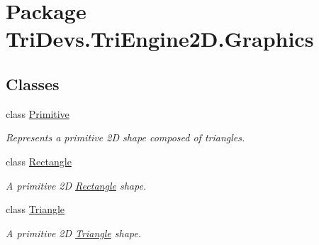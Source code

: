 \hypertarget{namespace_tri_devs_1_1_tri_engine2_d_1_1_graphics}{\section{Package Tri\-Devs.\-Tri\-Engine2\-D.\-Graphics}
\label{namespace_tri_devs_1_1_tri_engine2_d_1_1_graphics}
}
\subsection*{Classes}
\begin{DoxyCompactItemize}
\item 
class \hyperlink{class_tri_devs_1_1_tri_engine2_d_1_1_graphics_1_1_primitive}{Primitive}
\begin{DoxyCompactList}\small\item\em Represents a primitive 2\-D shape composed of triangles. \end{DoxyCompactList}\item 
class \hyperlink{class_tri_devs_1_1_tri_engine2_d_1_1_graphics_1_1_rectangle}{Rectangle}
\begin{DoxyCompactList}\small\item\em A primitive 2\-D \hyperlink{class_tri_devs_1_1_tri_engine2_d_1_1_graphics_1_1_rectangle}{Rectangle} shape. \end{DoxyCompactList}\item 
class \hyperlink{class_tri_devs_1_1_tri_engine2_d_1_1_graphics_1_1_triangle}{Triangle}
\begin{DoxyCompactList}\small\item\em A primitive 2\-D \hyperlink{class_tri_devs_1_1_tri_engine2_d_1_1_graphics_1_1_triangle}{Triangle} shape. \end{DoxyCompactList}\end{DoxyCompactItemize}
